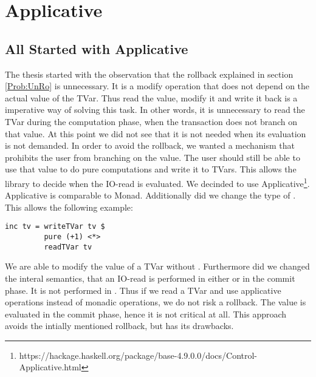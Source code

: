 
\chapter{Applicative} %

\label{Applicative} %

\section{All Started with Applicative}
The thesis started with the observation that the rollback explained in section \ref{Prob:UnRo} is 
unnecessary. It is a modify operation that does not depend on the actual value of the TVar. Thus 
read the value, modify it and write it back is a imperative way of solving this task. In other 
words, it is unnecessary to read the TVar during the computation phase, when the transaction does
not branch on that value. At this point we did not see that it is not needed when its evaluation is
not demanded. In order to avoid the rollback, we wanted a mechanism that prohibits the user from 
branching on the value. The user should still be able to use that value to do pure computations and 
write it to TVars. This allows the library to decide when the IO-read is evaluated. We decinded to 
use Applicative\footnote{https://hackage.haskell.org/package/base-4.9.0.0/docs/Control-Applicative.html}.
Applicative is comparable to Monad. Additionally did we change the type of 
. This allows the following
example: 
\begin{lstlisting}
inc tv = writeTVar tv $ 
         pure (+1) <*> 
         readTVar tv
\end{lstlisting}
We are able to modify the value of a TVar without \code{>>=}. Furthermore did we changed the interal
semantics, that an IO-read is performed in either \code{>>=} or in the commit phase. It is not performed
in . Thus if we read a TVar and use applicative operations instead of monadic operations,
we do not risk a rollback. The value is evaluated in the commit phase, hence it is not critical at all.
This approach avoids the intially mentioned rollback, but has its drawbacks. 

